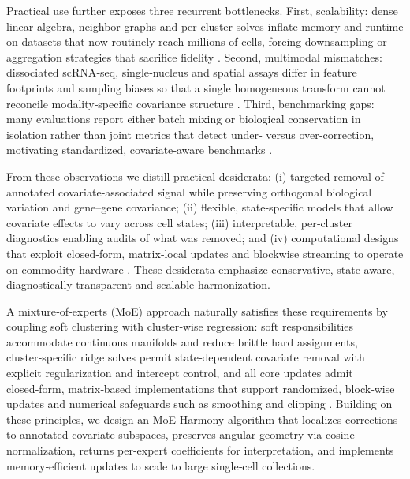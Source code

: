 \documentclass{article}
\begin{document}
Practical use further exposes three recurrent bottlenecks. First, scalability: dense linear algebra, neighbor graphs and per‑cluster solves inflate memory and runtime on datasets that now routinely reach millions of cells, forcing downsampling or aggregation strategies that sacrifice fidelity \citep{Bilous2021MetacellsUL,Hie2024ScanoramaIL}. Second, multimodal mismatches: dissociated scRNA‑seq, single‑nucleus and spatial assays differ in feature footprints and sampling biases so that a single homogeneous transform cannot reconcile modality‑specific covariance structure \citep{Azizi2018SingleCellMO,Galow2020IntegrativeCA,Baron2016AST}. Third, benchmarking gaps: many evaluations report either batch mixing or biological conservation in isolation rather than joint metrics that detect under‑ versus over‑correction, motivating standardized, covariate‑aware benchmarks \citep{Lein2007GenomewideAO,Der2019TubularCA,Rocque2021CreationOA}.

From these observations we distill practical desiderata: (i) targeted removal of annotated covariate‑associated signal while preserving orthogonal biological variation and gene–gene covariance; (ii) flexible, state‑specific models that allow covariate effects to vary across cell states; (iii) interpretable, per‑cluster diagnostics enabling audits of what was removed; and (iv) computational designs that exploit closed‑form, matrix‑local updates and blockwise streaming to operate on commodity hardware \citep{Zhang2019DefiningIC,Nicol2023RobustIO,Andreatta2020ProjectingST,Leek2007CapturingHI}. These desiderata emphasize conservative, state‑aware, diagnostically transparent and scalable harmonization.

A mixture‑of‑experts (MoE) approach naturally satisfies these requirements by coupling soft clustering with cluster‑wise regression: soft responsibilities accommodate continuous manifolds and reduce brittle hard assignments, cluster‑specific ridge solves permit state‑dependent covariate removal with explicit regularization and intercept control, and all core updates admit closed‑form, matrix‑based implementations that support randomized, block‑wise updates and numerical safeguards such as smoothing and clipping \citep{Dhillon2004ConceptDF,Zhang2023SynEcoSysAM}. Building on these principles, we design an MoE‑Harmony algorithm that localizes corrections to annotated covariate subspaces, preserves angular geometry via cosine normalization, returns per‑expert coefficients for interpretation, and implements memory‑efficient updates to scale to large single‑cell collections.
\end{document}
